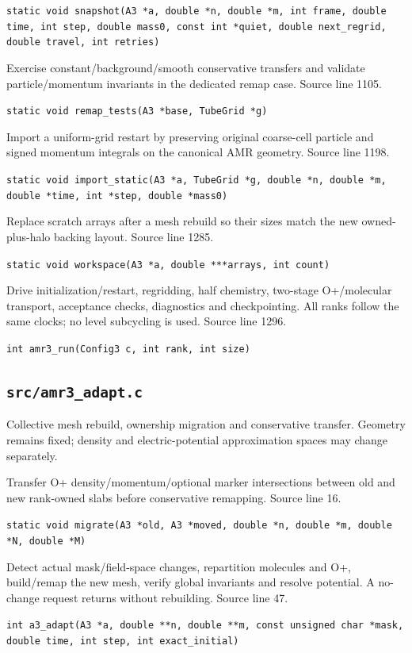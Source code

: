 \begin{description}[style=nextline,leftmargin=0pt,labelindent=0pt,labelwidth=0pt,labelsep=0pt]
{\small\nolinkurl{static void snapshot(A3 *a, double *n, double *m, int frame, double time, int step, double mass0, const int *quiet, double next_regrid, double travel, int retries)}}
\item[\texttt{remap\_tests}] Exercise constant/background/smooth conservative transfers and validate particle/momentum invariants in the dedicated remap case. Source line 1105.\par
{\small\nolinkurl{static void remap_tests(A3 *base, TubeGrid *g)}}
\item[\texttt{import\_static}] Import a uniform-grid restart by preserving original coarse-cell particle and signed momentum integrals on the canonical AMR geometry. Source line 1198.\par
{\small\nolinkurl{static void import_static(A3 *a, TubeGrid *g, double *n, double *m, double *time, int *step, double *mass0)}}
\item[\texttt{workspace}] Replace scratch arrays after a mesh rebuild so their sizes match the new owned-plus-halo backing layout. Source line 1285.\par
{\small\nolinkurl{static void workspace(A3 *a, double ***arrays, int count)}}
\item[\texttt{amr3\_run}] Drive initialization/restart, regridding, half chemistry, two-stage O+/molecular transport, acceptance checks, diagnostics and checkpointing. All ranks follow the same clocks; no level subcycling is used. Source line 1296.\par
{\small\nolinkurl{int amr3_run(Config3 c, int rank, int size)}}
\end{description}
\subsection{\texttt{src/amr3\_adapt.c}}
Collective mesh rebuild, ownership migration and conservative transfer. Geometry remains fixed; density and electric-potential approximation spaces may change separately.
\begin{description}[style=nextline,leftmargin=0pt,labelindent=0pt,labelwidth=0pt,labelsep=0pt]
\item[\texttt{migrate}] Transfer O+ density/momentum/optional marker intersections between old and new rank-owned slabs before conservative remapping. Source line 16.\par
{\small\nolinkurl{static void migrate(A3 *old, A3 *moved, double *n, double *m, double *N, double *M)}}
\item[\texttt{a3\_adapt}] Detect actual mask/field-space changes, repartition molecules and O+, build/remap the new mesh, verify global invariants and resolve potential. A no-change request returns without rebuilding. Source line 47.\par
{\small\nolinkurl{int a3_adapt(A3 *a, double **n, double **m, const unsigned char *mask, double time, int step, int exact_initial)}}
\end{description}
